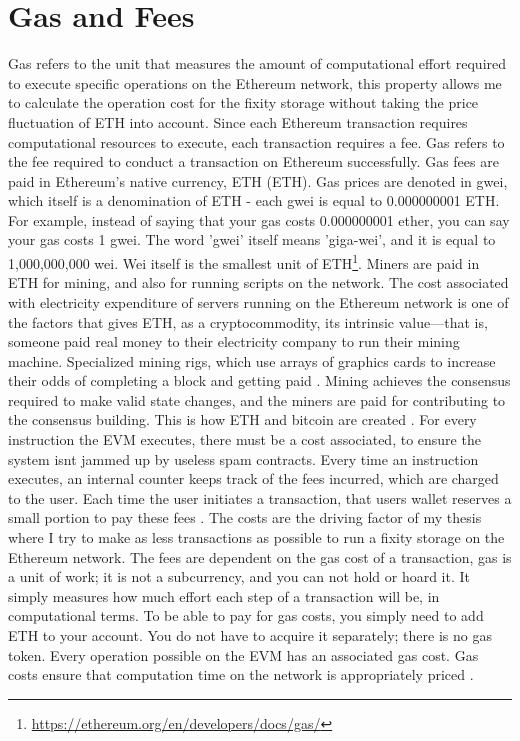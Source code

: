 \section{Gas and Fees}
\label{sec:costs}
Gas refers to the unit that measures the amount of computational effort required to execute specific operations on the Ethereum network, this property allows me to calculate the operation cost for the fixity storage without taking the price fluctuation of ETH into account. Since each Ethereum transaction requires computational resources to execute, each transaction requires a fee. Gas refers to the fee required to conduct a transaction on Ethereum successfully.
Gas fees are paid in Ethereum's native currency, ETH (ETH). Gas prices are denoted in gwei, which itself is a denomination of ETH - each gwei is equal to 0.000000001 ETH. For example, instead of saying that your gas costs 0.000000001 ether, you can say your gas costs 1 gwei. The word 'gwei' itself means 'giga-wei', and it is equal to 1,000,000,000 wei. Wei itself is the smallest unit of ETH\footnote{\url{https://ethereum.org/en/developers/docs/gas/}}.
Miners are paid in ETH for mining, and also for running scripts on the network. The cost associated with electricity expenditure of servers running on the Ethereum network is one of the factors that gives ETH, as a cryptocommodity, its intrinsic value—that is, someone paid real money to their electricity company to run their mining machine. Specialized mining rigs, which use arrays of graphics cards to increase their odds of completing a block and getting paid \cite[12]{dannen2017introducing}. 
Mining achieves the consensus required to make valid state changes, and the miners are paid for contributing to the consensus building. This is how ETH and bitcoin are created  \cite[57]{dannen2017introducing}. 
For every instruction the EVM executes, there must be a cost associated, to ensure the system isnt jammed up by useless spam contracts. Every time an instruction executes, an internal counter keeps track of the fees incurred, which are charged to the user. Each time the user initiates a transaction, that users wallet reserves a small portion to pay these fees \cite[58]{dannen2017introducing}. The costs are the driving factor of my thesis where I try to make as less transactions as possible to run a fixity storage on the Ethereum network. 
The fees are dependent on the gas cost of a transaction, gas is a unit of work; it is not a subcurrency, and you can not hold or hoard it. It simply measures how much effort each step of a transaction will be, in computational terms. To be able to pay for gas costs, you simply need to add ETH to your account. You do not have to acquire it separately; there is no gas token. Every operation possible on the EVM has an associated gas cost. Gas costs ensure that computation time on the network is appropriately priced \cite[59]{dannen2017introducing}.
